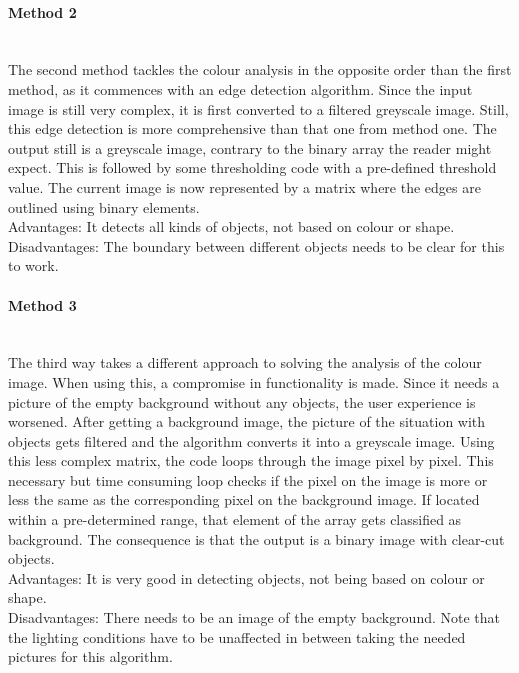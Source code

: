 \documentclass[11pt]{article}
\begin{document}
\paragraph{Method 2}\mbox{}\\
The second method tackles the colour analysis in the opposite order than the first method, as it commences with an edge detection algorithm. Since the input image is still very complex, it is first converted to a filtered greyscale image. Still, this edge detection is more comprehensive than that one from method one. The output still is a greyscale image, contrary to the binary array the reader might expect. This is followed by some thresholding code with a pre-defined threshold value. The current image is now represented by a matrix where the edges are outlined using binary elements.
\\Advantages: It detects all kinds of objects, not based on colour or shape.
\\Disadvantages: The boundary between different objects needs to be clear for this to work.
\paragraph{Method 3}\mbox{}\\
The third way takes a different approach to solving the analysis of the colour image. When using this, a compromise in functionality is made. Since it needs a picture of the empty background without any objects, the user experience is worsened. After getting a background image, the picture of the situation with objects gets filtered and the algorithm converts it into a greyscale image. Using this less complex matrix, the code loops through the image pixel by pixel. This necessary but time consuming loop checks if the pixel on the image is more or less the same as the corresponding pixel on the background image. If located within a pre-determined range, that element of the array gets classified as background. The consequence is that the output is a binary image with clear-cut objects.
\\Advantages: It is very good in detecting objects, not being based on colour or shape.
\\Disadvantages: There needs to be an image of the empty background. Note that the lighting conditions have to be unaffected in between taking the needed pictures for this algorithm.
\end{document}
